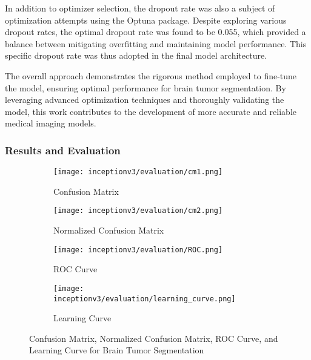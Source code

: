 In addition to optimizer selection, the dropout rate was also a subject of optimization attempts using the Optuna package. Despite exploring various dropout rates, the optimal dropout rate was found to be 0.055, which provided a balance between mitigating overfitting and maintaining model performance. This specific dropout rate was thus adopted in the final model architecture.

The overall approach demonstrates the rigorous method employed to fine-tune the model, ensuring optimal performance for brain tumor segmentation. By leveraging advanced optimization techniques and thoroughly validating the model, this work contributes to the development of more accurate and reliable medical imaging models.


\subsubsection{Results and Evaluation}

\begin{figure}[H]
  \centering
  \begin{subfigure}[b]{0.2\textwidth}
    \centering
    \texttt{[image: inceptionv3/evaluation/cm1.png]}
    \caption{Confusion Matrix}
    \label{fig:inceptionv3_cm1}
  \end{subfigure}
  \hfill
  \begin{subfigure}[b]{0.2\textwidth}
    \centering
    \texttt{[image: inceptionv3/evaluation/cm2.png]}
    \caption{Normalized Confusion Matrix}
    \label{fig:inceptionv3_cm2}
  \end{subfigure}
  \hfill
  \begin{subfigure}[b]{0.25\textwidth}
    \centering
    \texttt{[image: inceptionv3/evaluation/ROC.png]}
    \caption{ROC Curve}
    \label{fig:inceptionv3_roc}
  \end{subfigure}
  \hfill
  \begin{subfigure}[b]{0.25\textwidth}
    \centering
    \texttt{[image: inceptionv3/evaluation/learning\_curve.png]}
    \caption{Learning Curve}
    \label{fig:inceptionv3_learning_curve}
  \end{subfigure}
  \caption{Confusion Matrix, Normalized Confusion Matrix, ROC Curve, and Learning Curve for Brain Tumor Segmentation}
  \label{fig:inceptionv3_evaluation}
\end{figure}

